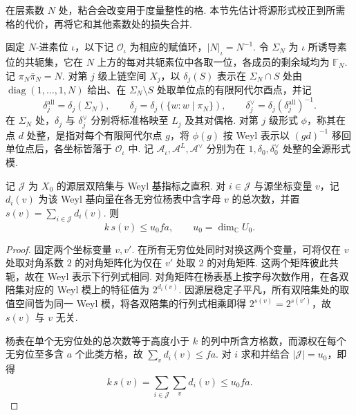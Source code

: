 在层素数 $N$ 处，粘合会改变用于度量整性的格. 本节先估计将源形式校正到所需格的代价，再将它和其他素数处的损失合并.

固定 $N$-进素位 $\iota$，以下记 $\mathcal O_\iota$ 为相应的赋值环，$|N|_\iota=N^{-1}$. 令 $\Sigma_N$ 为 $\iota$ 所诱导素位的共轭集，它在 $N$ 上方的每对共轭素位中各取一位，各成员的剩余域均为 $\mathbb F_N$. 记 $\pi_N\bar\pi_N=N$. 对第 $j$ 级上链空间 $X_j$，以 $\delta_j(S)$ 表示在 $\Sigma_N\cap S$ 处由 $\operatorname{diag}(1,\ldots,1,N)$ 给出、在 $\Sigma_N\setminus S$ 处取单位点的有限阿代尔酉点，并记
\[
 \delta_j^{\mathrm{all}}=\delta_j(\Sigma_N),\qquad
 \delta_j=\delta_j(\{w:w\mid\pi_N\}),\qquad
 \delta_j^\vee=\delta_j(\delta_j^{\mathrm{all}})^{-1}.
\]
在 $\Sigma_N$ 处，$\delta_j$ 与 $\delta_j^\vee$ 分别将标准格映至 $L_j$ 及其对偶格. 对第 $j$ 级形式 $\phi$，称其在点 $d$ 处整，是指对每个有限阿代尔点 $g$，将 $\phi(g)$ 按 Weyl 表示以 $(gd)^{-1}$ 移回单位点后，各坐标皆落于 $\mathcal O_\iota$ 中. 记 $\mathcal A_\iota,\mathcal A^L,\mathcal A^\vee$ 分别为在 $1,\delta_0,\delta_0^\vee$ 处整的全源形式模.

\begin{lemma}[源空间的末坐标平均次数]
\label{lem:a-level-mean-degree}
\emitthmsource
记 $\mathcal J$ 为 $X_0$ 的源层双陪集与 Weyl 基指标之直积. 对 $i\in\mathcal J$ 与源坐标变量 $v$，记 $d_i(v)$ 为该 Weyl 基向量在各无穷位杨表中含字母 $v$ 的总次数，并置 $s(v)=\sum_{i\in\mathcal J}d_i(v)$. 则
\[
 k\,s(v)\le u_0fa,\qquad u_0=\dim_{\mathbb C}U_0.
\]
\end{lemma}
\begin{proof}
固定两个坐标变量 $v,v'$. 在所有无穷位处同时对换这两个变量，可将仅在 $v$ 处取对角系数 $2$ 的对角矩阵化为仅在 $v'$ 处取 $2$ 的对角矩阵. 这两个矩阵彼此共轭，故在 Weyl 表示下行列式相同. 对角矩阵在杨表基上按字母次数作用，在各双陪集对应的 Weyl 模上的特征值为 $2^{d_i(v)}$. 因源层稳定子平凡，所有双陪集处的取值空间皆为同一 Weyl 模，将各双陪集的行列式相乘即得 $2^{s(v)}=2^{s(v')}$，故 $s(v)$ 与 $v$ 无关.

杨表在单个无穷位处的总次数等于高度小于 $k$ 的列中所含方格数，而源权在每个无穷位至多含 $a$ 个此类方格，故 $\sum_v d_i(v)\le fa$. 对 $i$ 求和并结合 $|\mathcal J|=u_0$，即得
\[
 k\,s(v)=\sum_{i\in\mathcal J}\sum_v d_i(v)\le u_0fa .
\]
\end{proof}

